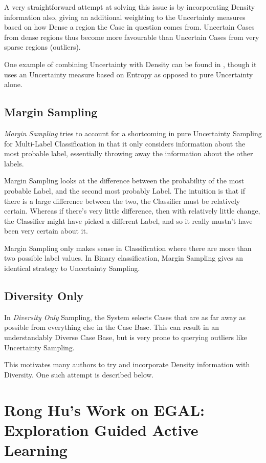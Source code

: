 \documentclass[a4paper,11pt]{report}
\begin{document}
A very straightforward attempt at solving this issue is by incorporating Density information also, giving an additional weighting to the Uncertainty measures based on how Dense a region the Case in question comes from. Uncertain Cases from dense regions thus become more favourable than Uncertain Cases from very sparse regions (outliers).

One example of combining Uncertainty with Density can be found in \citep{Zhu2008}, though it uses an Uncertainty measure based on Entropy as opposed to pure Uncertainty alone.

\subsection{Margin Sampling}

\emph{Margin Sampling} tries to account for a shortcoming in pure Uncertainty Sampling for Multi-Label Classification in that it only considers information about the most probable label, essentially throwing away the information about the other labels.

Margin Sampling looks at the difference between the probability of the most probable Label, and the second most probably Label. The intuition is that if there is a large difference between the two, the Classifier must be relatively certain. Whereas if there's very little difference, then with relatively little change, the Classifier might have picked a different Label, and so it really mustn't have been very certain about it.

Margin Sampling only makes sense in Classification where there are more than two possible label values. In Binary classification, Margin Sampling gives an identical strategy to Uncertainty Sampling.

\subsection{Diversity Only}
In \emph{Diversity Only} Sampling, the System selects Cases that are as far away as possible from everything else in the Case Base. This can result in an understandably Diverse Case Base, but is very prone to querying outliers like Uncertainty Sampling.

This motivates many authors to try and incorporate Density information with Diversity. One such attempt is described below.

\section{Rong Hu's Work on EGAL: Exploration Guided Active Learning}
\end{document}
